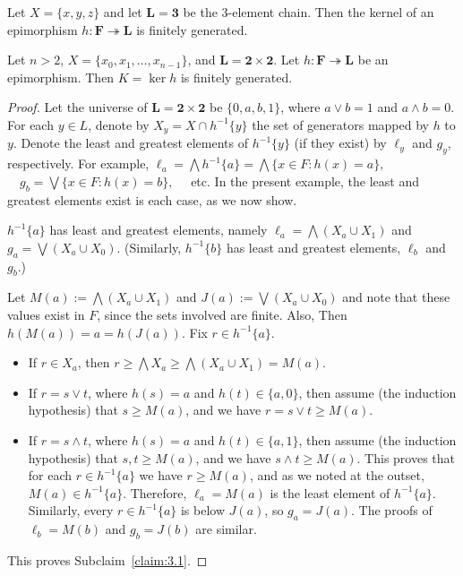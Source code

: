 \begin{prop}\label{prop:2} 
Let $X = \{x, y, z\}$ and let $\mathbf{L} = \mathbf{3}$ be the 3-element chain.    
Then the kernel of an epimorphism $h\colon \mathbf{F} \twoheadrightarrow \mathbf{L}$ 
is finitely generated.
\end{prop}

\begin{prop}\label{prop:3} 
Let $n > 2$, $X = \{x_0, x_1,\dots, x_{n-1}\}$, and $\mathbf{L} = \mathbf{2} \times \mathbf{2}$.  
Let $h\colon \mathbf{F} \twoheadrightarrow \mathbf{L}$ be an epimorphism. 
Then $K = \operatorname{ker}h$ is finitely generated.  
\end{prop}
\begin{proof} 
Let the universe of $\mathbf{L} = \mathbf{2} \times \mathbf{2}$ be $\{0, a, b, 1\}$, 
where $a\vee b = 1$ and $a\wedge b = 0$. For each $y \in L$, denote by 
$X_y = X \cap h^{-1}\{y\}$ the set of generators mapped by $h$ to $y$. 
Denote the least and greatest elements of $h^{-1}\{y\}$ (if they exist) by $\ell_y$ 
and $g_y$, respectively.  For example, 
$\ell_a = \bigwedge h^{-1}\{a\} = \bigwedge \{x\in F: h(x) = a\},\;$ 
$\quad g_b = \bigvee \{x\in F : h(x) = b\},\quad$ etc. 
In the present example, the least and greatest elements exist is each case, as we now show.

\begin{subclaim}\label{claim:3.1}
  $h^{-1}\{a\}$ has least and greatest elements, namely 
  $\ell_a = \bigwedge (X_a \cup X_1)$ and $g_a = \bigvee (X_a\cup X_0)$.  
  (Similarly, $h^{-1}\{b\}$ has least and greatest elements, $\ell_b$ and $g_b$.)
\end{subclaim}
Let $M(a):=\bigwedge (X_a\cup X_1)$ and $J(a):=\bigvee (X_a\cup X_0)$ and 
note that these values exist in $F$, since the sets involved are finite. Also, 
Then $h(M(a)) = a = h(J(a))$. Fix $r \in h^{-1}\{a\}$.  
\begin{itemize}
\item If $r \in X_a$, then $r\geqslant \bigwedge X_a \geqslant \bigwedge (X_a\cup X_1) = M(a)$.

\item If $r = s \vee t$, where $h(s) = a$ and $h(t) \in \{a, 0\}$, then    
assume (the induction hypothesis) that $s \geqslant M(a)$, and we have
$r = s\vee t \geqslant M(a)$.

\item If $r = s \wedge t$, where $h(s) = a$ and $h(t) \in \{a, 1\}$, then 
assume (the induction hypothesis) that $s, t \geqslant M(a)$, and we have 
$s \wedge t \geqslant M(a)$.
This proves that for each $r \in h^{-1}\{a\}$ we have $r \geqslant M(a)$, and 
as we noted at the outset, $M(a)\in h^{-1}\{a\}$. Therefore, $\ell_a = M(a)$ is 
the least element of $h^{-1}\{a\}$. Similarly, every $r \in h^{-1}\{a\}$ is 
below $J(a)$, so $g_a = J(a)$.  The proofs of $\ell_b = M(b)$ and $g_b = J(b)$ 
are similar.
\end{itemize}
This proves Subclaim~\ref{claim:3.1}.



\end{proof}
